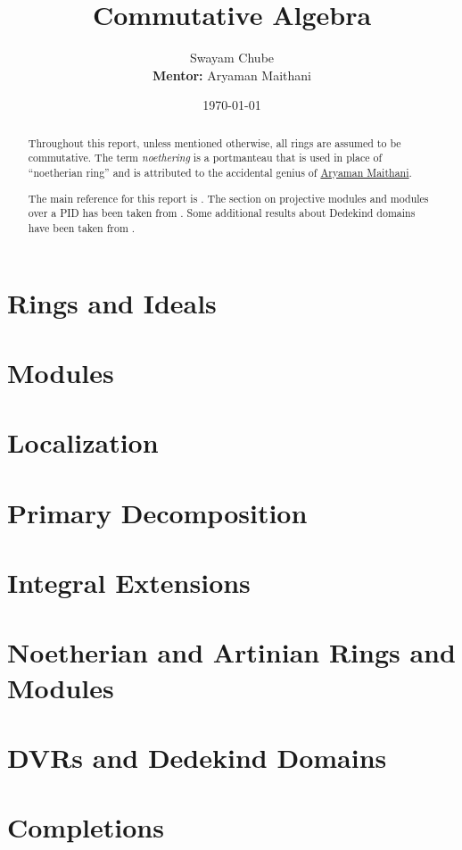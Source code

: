 \documentclass[oneside]{report}
\title{Commutative Algebra}
\author{Swayam Chube\\\textbf{Mentor:} Aryaman Maithani}
\date{\today}
\begin{document}
\maketitle

\begin{abstract}
    Throughout this report, unless mentioned otherwise, all rings are assumed to be commutative. The term \textit{noethering} is a portmanteau that is used in place of ``noetherian ring'' and is attributed to the accidental genius of \href{https://www.youtube.com/live/RrjJfyEF7Ak?feature=share&t=102}{Aryaman Maithani}.

    The main reference for this report is \cite{AM69}. The section on projective modules and modules over a PID has been taken from \cite{Lan02}. Some additional results about Dedekind domains have been taken from \cite{milne-algnt}.
\end{abstract}

\tableofcontents

\chapter{Rings and Ideals}


\chapter{Modules}


\chapter{Localization}


\chapter{Primary Decomposition}


\chapter{Integral Extensions}


\chapter{Noetherian and Artinian Rings and Modules}


\chapter{DVRs and Dedekind Domains}


\chapter{Completions}




\end{document}

